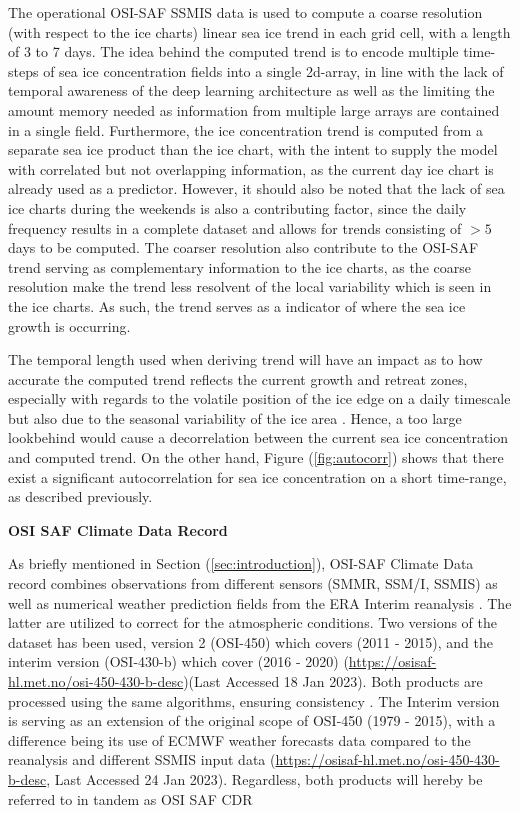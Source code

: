 \documentclass[../main/thesis.tex]{subfiles}
\begin{document}
The operational OSI-SAF SSMIS data is used to compute a coarse resolution (with respect to the ice charts) linear sea ice trend in each grid cell, with a length of 3 to 7 days. The idea behind the computed trend is to encode multiple time-steps of sea ice concentration fields into a single 2d-array, in line with the lack of temporal awareness of the deep learning architecture as well as the limiting the amount memory needed as information from multiple large arrays are contained in a single field. Furthermore, the ice concentration trend is computed from a separate sea ice product than the ice chart, with the intent to supply the model with correlated but not overlapping information, as the current day ice chart is already used as a predictor. However, it should also be noted that the lack of sea ice charts during the weekends \citep{Dinessen2020} is also a contributing factor, since the daily frequency results in a complete dataset and allows for trends consisting of $>5$ days to be computed. The coarser resolution also contribute to the OSI-SAF trend serving as complementary information to the ice charts, as the coarse resolution make the trend less resolvent of the local variability which is seen in the ice charts. As such, the trend serves as a indicator of where the sea ice growth is occurring.

The temporal length used when deriving trend will have an impact as to how accurate the computed trend reflects the current growth and retreat zones, especially with regards to the volatile position of the ice edge on a daily timescale but also due to the seasonal variability of the ice area \citep{Holland2016}. Hence, a too large lookbehind would cause a decorrelation between the current sea ice concentration and computed trend. On the other hand, Figure (\ref{fig:autocorr}) shows that there exist a significant autocorrelation for sea ice concentration on a short time-range, as described previously.

\textbf{OSI SAF Climate Data Record}

As briefly mentioned in Section (\ref{sec:introduction}), OSI-SAF Climate Data record combines observations from different sensors (SMMR, SSM/I, SSMIS) as well as numerical weather prediction fields from the ERA Interim reanalysis \citep{Dee2011}. The latter are utilized to correct for the atmospheric conditions. Two versions of the dataset has been used, version 2 (OSI-450) which covers (2011 - 2015), and the interim version (OSI-430-b) which cover (2016 - 2020) (\url{https://osisaf-hl.met.no/osi-450-430-b-desc})(Last Accessed 18 Jan 2023). Both products are processed using the same algorithms, ensuring consistency \citep{Lavergne2019a}. The Interim version is serving as an extension of the original scope of OSI-450 (1979 - 2015), with a difference being its use of ECMWF weather forecasts data compared to the reanalysis and different SSMIS input data (\url{https://osisaf-hl.met.no/osi-450-430-b-desc}, Last Accessed 24 Jan 2023). Regardless, both products will hereby be referred to in tandem as OSI SAF CDR
\end{document}
